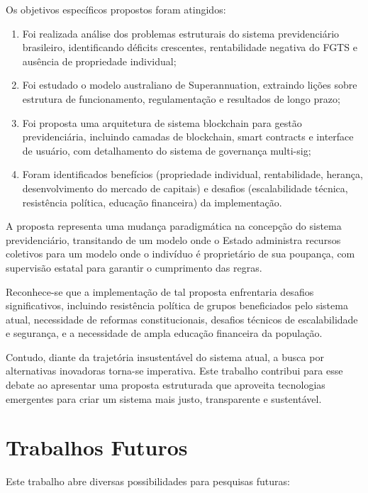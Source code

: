 Os objetivos específicos propostos foram atingidos:

\begin{enumerate}
    \item Foi realizada análise dos problemas estruturais do sistema previdenciário brasileiro, identificando déficits crescentes, rentabilidade negativa do FGTS e ausência de propriedade individual;
    
    \item Foi estudado o modelo australiano de Superannuation, extraindo lições sobre estrutura de funcionamento, regulamentação e resultados de longo prazo;
    
    \item Foi proposta uma arquitetura de sistema blockchain para gestão previdenciária, incluindo camadas de blockchain, smart contracts e interface de usuário, com detalhamento do sistema de governança multi-sig;
    
    \item Foram identificados benefícios (propriedade individual, rentabilidade, herança, desenvolvimento do mercado de capitais) e desafios (escalabilidade técnica, resistência política, educação financeira) da implementação.
\end{enumerate}

A proposta representa uma mudança paradigmática na concepção do sistema previdenciário, transitando de um modelo onde o Estado administra recursos coletivos para um modelo onde o indivíduo é proprietário de sua poupança, com supervisão estatal para garantir o cumprimento das regras.

Reconhece-se que a implementação de tal proposta enfrentaria desafios significativos, incluindo resistência política de grupos beneficiados pelo sistema atual, necessidade de reformas constitucionais, desafios técnicos de escalabilidade e segurança, e a necessidade de ampla educação financeira da população.

Contudo, diante da trajetória insustentável do sistema atual, a busca por alternativas inovadoras torna-se imperativa. Este trabalho contribui para esse debate ao apresentar uma proposta estruturada que aproveita tecnologias emergentes para criar um sistema mais justo, transparente e sustentável.

\section{Trabalhos Futuros}

Este trabalho abre diversas possibilidades para pesquisas futuras:

